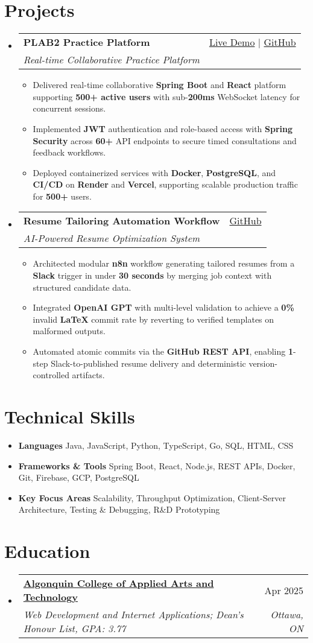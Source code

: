 \documentclass[letterpaper,11pt]{article}
\makeatletter
\newcommand{\resumeItem}[1]{\item\small{#1 \vspace{-2pt}}}
\newcommand{\resumeSubheading}[4]{
  \vspace{-1pt}\item
    \begin{tabular*}{0.97\textwidth}[t]{l@{\extracolsep{\fill}}r}
      \textbf{#1} & #2 \\
      \textit{\small#3} & \textit{\small #4} \\
    \end{tabular*}\vspace{-5pt}
}
\newcommand{\resumeSubHeadingListStart}{\begin{itemize}[leftmargin=*]}
\newcommand{\resumeSubHeadingListEnd}{\end{itemize}}
\newcommand{\resumeItemListStart}{\begin{itemize}}
\newcommand{\resumeItemListEnd}{\end{itemize}\vspace{-5pt}}
\makeatother
\begin{document}
\section{Projects}
  \resumeSubHeadingListStart
    \resumeSubheading
      {\textbf{PLAB2 Practice Platform}}{\href{https://plab2practice.com}{Live Demo} | \href{https://github.com/altansaid/plab2projectnew}{GitHub}}
      {Real-time Collaborative Practice Platform}{}
      \resumeItemListStart
        \resumeItem{Delivered real-time collaborative \textbf{Spring Boot} and \textbf{React} platform supporting \textbf{500+ active users} with sub-\textbf{200ms} WebSocket latency for concurrent sessions.}
        \resumeItem{Implemented \textbf{JWT} authentication and role-based access with \textbf{Spring Security} across \textbf{60+} API endpoints to secure timed consultations and feedback workflows.}
        \resumeItem{Deployed containerized services with \textbf{Docker}, \textbf{PostgreSQL}, and \textbf{CI/CD} on \textbf{Render} and \textbf{Vercel}, supporting scalable production traffic for \textbf{500+} users.}
      \resumeItemListEnd

    \resumeSubheading
      {\textbf{Resume Tailoring Automation Workflow}}{\href{https://github.com/altansaid/resume-automation-workflow}{GitHub}}
      {AI-Powered Resume Optimization System}{}
      \resumeItemListStart
    \resumeItem{Architected modular \textbf{n8n} workflow generating tailored resumes from a \textbf{Slack} trigger in under \textbf{30 seconds} by merging job context with structured candidate data.}
    \resumeItem{Integrated \textbf{OpenAI GPT} with multi-level validation to achieve a \textbf{0\%} invalid \textbf{LaTeX} commit rate by reverting to verified templates on malformed outputs.}
    \resumeItem{Automated atomic commits via the \textbf{GitHub REST API}, enabling \textbf{1}-step Slack-to-published resume delivery and deterministic version-controlled artifacts.}



      \resumeItemListEnd
  \resumeSubHeadingListEnd

\section{Technical Skills}
  \resumeItemListStart
    \resumeItem{\textbf{Languages}}{Java, JavaScript, Python, TypeScript, Go, SQL, HTML, CSS}
    \resumeItem{\textbf{Frameworks \& Tools}}{Spring Boot, React, Node.js, REST APIs, Docker, Git, Firebase, GCP, PostgreSQL}
    \resumeItem{\textbf{Key Focus Areas}}{Scalability, Throughput Optimization, Client-Server Architecture, Testing \& Debugging, R\&D Prototyping}
  \resumeItemListEnd

\section{Education}
  \resumeSubHeadingListStart
    \resumeSubheading
      {\href{https://www.algonquincollege.com/sat/program/web-development-internet-applications/}{Algonquin College of Applied Arts and Technology}}{Apr 2025}
      {Web Development and Internet Applications; Dean's Honour List, GPA: 3.77}{Ottawa, ON}
  \resumeSubHeadingListEnd
\end{document}
